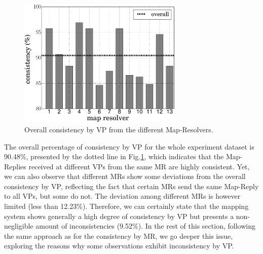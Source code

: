 \begin{figure}[!t]
	\centering
	\includegraphics[width=0.7\textwidth]{Pics/Percentage_consistency_13MR_VP.eps}
	\caption{Overall consistency by VP from the different Map-Resolvers.}
	\label{fig:Percentage_consistency_13MR_VP}
\end{figure}

The overall percentage of consistency by VP for the whole experiment dataset is 90.48\%, presented by the dotted line in Fig.\ref{fig:Percentage_consistency_13MR_VP}, which indicates that the Map-Replies received at different VPs from the same MR are highly consistent. Yet, we can also observe that different MRs show some deviations from the overall consistency by VP, reflecting the fact that certain MRs send the same Map-Reply to all VPs, but some do not. The deviation among different MRs is however limited (less than 12.23\%). Therefore, we can certainly state that the mapping system shows generally a high degree of consistency by VP but presents a non-negligible amount of inconsistencies (9.52\%). In the rest of this section, following the same approach as for the consistency by MR, we go deeper this issue, exploring the reasons why some observations exhibit inconsistency by VP.

